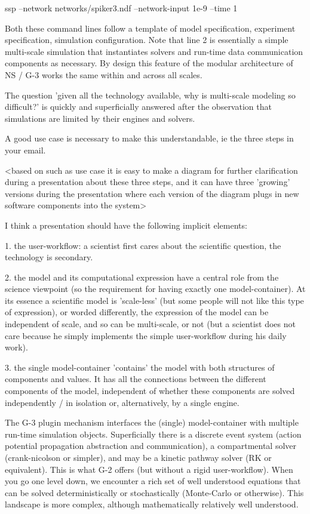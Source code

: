 \documentclass[12pt]{article}
\begin{document}
ssp --network networks/spiker3.ndf --network-input 1e-9 --time 1

Both these command lines follow a template of model specification,
experiment specification, simulation configuration.  Note that line 2
is essentially a simple multi-scale simulation that instantiates
solvers and run-time data communication components as necessary.  By
design this feature of the modular architecture of NS / G-3 works the
same within and across all scales.

The question 'given all the technology available, why is multi-scale
modeling so difficult?' is quickly and superficially answered after
the observation that simulations are limited by their engines and
solvers.

A good use case is necessary to make this understandable, ie the three
steps in your email.

<based on such as use case it is easy to make a diagram for further
clarification during a presentation about these three steps, and it
can have three 'growing' versions during the presentation where each
version of the diagram plugs in new software components into the
system>

I think a presentation should have the following implicit elements:

1. the user-workflow: a scientist first cares about the scientific
question, the technology is secondary.

2. the model and its computational expression have a central role from
the science viewpoint (so the requirement for having exactly one
model-container).  At its essence a scientific model is 'scale-less'
(but some people will not like this type of expression), or worded
differently, the expression of the model can be independent of scale,
and so can be multi-scale, or not (but a scientist does not care
because he simply implements the simple user-workflow during his daily
work).

3. the single model-container 'contains' the model with both
structures of components and values.  It has all the connections
between the different components of the model, independent of whether
these components are solved independently / in isolation or,
alternatively, by a single engine.

The G-3 plugin mechanism interfaces the (single) model-container with
multiple run-time simulation objects.  Superficially there is a
discrete event system (action potential propagation abstraction and
communication), a compartmental solver (crank-nicolson or simpler),
and may be a kinetic pathway solver (RK or equivalent).  This is what
G-2 offers (but without a rigid user-workflow).  When you go one level
down, we encounter a rich set of well understood equations that can be
solved deterministically or stochastically (Monte-Carlo or otherwise).
 This landscape is more complex, although mathematically relatively
well understood.
\end{document}
